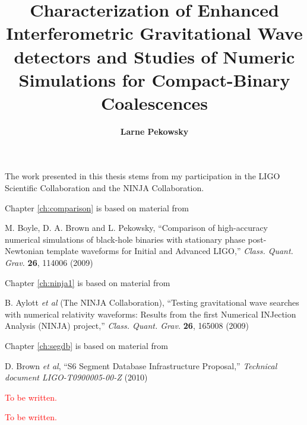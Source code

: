 \documentclass[12pt,notitlepage]{report}
\newcommand\fake[1]{\textcolor{red}{#1}}
\begin{document}
\title{
Characterization of Enhanced Interferometric Gravitational Wave
detectors and Studies of Numeric Simulations for Compact-Binary
Coalescences
}
\author{\bf Larne Pekowsky}
\havededicationtrue
\dedication{to\\ my parents}
\haveminorfalse
\copyrighttrue
\doctoratetrue
\figurespagetrue
\tablespagetrue


\beforepreface
{}
The work presented in this thesis stems from my participation in the LIGO
Scientific Collaboration and the NINJA Collaboration.


\vspace*{0.5cm}

\noindent Chapter \ref{ch:comparison} is based on material from

\vspace*{0.25cm}

\noindent M. Boyle, D. A. Brown and L. Pekowsky, ``Comparison of high-accuracy
numerical simulations of black-hole binaries with stationary phase
post-Newtonian template waveforms for Initial and Advanced LIGO,''
{\it Class. Quant. Grav.} {\bf 26}, 114006 (2009)

\vspace*{0.5cm}

\noindent Chapter \ref{ch:ninja1} is based on material from

\vspace*{0.25cm}

\noindent B. Aylott {\it et al} (The NINJA Collaboration), ``Testing
gravitational wave searches with numerical relativity waveforms:
Results from the first Numerical INJection Analysis (NINJA) project,''
{\it Class. Quant. Grav.} {\bf 26}, 165008 (2009)


\vspace*{0.5cm}

\noindent Chapter \ref{ch:segdb} is based on material from

\vspace*{0.25cm}

\noindent D. Brown {\it et al}, ``S6 Segment Database
Infrastructure Proposal,'' {\it Technical document
{LIGO}-T0900005-00-Z} (2010)


\fake{To be written.}

\fake{To be written.}
\end{document}
